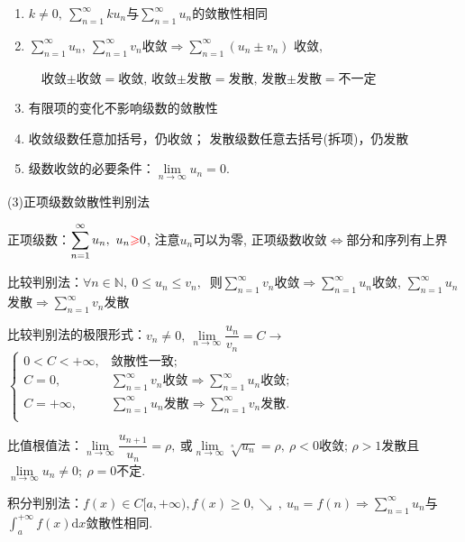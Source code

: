 \documentclass[UTF8]{ctexart}
\numberwithin{equation}{section}
\numberwithin{figure}{section}
\numberwithin{table}{section}
\newcommand\dif{\mathrm{d}}
\newcommand\no{\noindent}
\newcommand\dis{\displaystyle}
\newcommand\ls{\leqslant}
\newcommand\gs{\geqslant}
\newcommand\limn{\dis\lim\limits_{n\to\infty}}
\newcommand\sumn{\dis\sum\limits_{n=1}^{\infty}}
\newcommand\intd{\dis\int}
\begin{document}
\begin{spacing}{2}
\begin{enumerate}[itemindent=1.4em, label=(\alph*)]
\item $k\neq0,\ \sumn ku_n$与$\sumn u_n$的敛散性相同

\item $\sumn u_n,\ \sumn v_n$收敛$\Longrightarrow\sumn(u_n\pm v_n)$
收敛, 

\vspace{0.2cm}

$\quad$收敛$\pm$收敛$=$收敛, 收敛$\pm$发散$=$发散, 发散$\pm$发散$=$不一定 

\item 有限项的变化不影响级数的敛散性

\item 收敛级数任意\textcolor[rgb]{1,0,0}{加括号}，仍收敛；
发散级数任意\textcolor[rgb]{1,0,0}{去括号(拆项)}，仍发散

\item 级数收敛的必要条件：$\limn u_n=0.$

\end{enumerate}

\no(3)正项级数敛散性判别法

正项级数：$\sumn u_n,\ u_n \textcolor[rgb]{1,0,0}{\gs}0$, 注意$u_n$可以为零, 
正项级数收敛$\Longleftrightarrow$部分和序列有上界

比较判别法：$\forall n\in\mathbb{N},\ 0\ls u_n\ls v_n,\ $
则$\sumn v_n$收敛$\Longrightarrow\sumn u_n$收敛, 
$\sumn u_n$发散$\Longrightarrow\sumn v_n$发散

\vspace{0.3cm}

比较判别法的极限形式：$v_n\neq0,\ \limn \dfrac{u_n}{v_n}=C\longrightarrow$
$\left\{\begin{array}{ll}
0<C<+\infty, &\text{敛散性一致;}\\
C=0,&\sumn v_n\text{收敛}\Longrightarrow\sumn u_n\text{收敛;}\\
C=+\infty,&\sumn u_n\text{发散}\Longrightarrow\sumn v_n\text{发散}.\\
\end{array}\right.$

\vspace{0.3cm}

比值根值法：$\limn\dfrac{u_{n+1}}{u_n}=\rho,\ $或$\limn \sqrt[^n\!]{u_n}=\rho,\ 
\rho<0$收敛; $\rho>1$发散且$\limn u_n\neq0;\ \rho=0$不定.

\vspace{0.2cm}

积分判别法：$f(x)\in C[a,+\infty),f(x)\gs0,\searrow\ ,\ u_n=f(n)\Longrightarrow
\sumn u_n$与$\intd_a^{+\infty} f(x)\dif x$敛散性相同.


\end{spacing}
\end{document}
